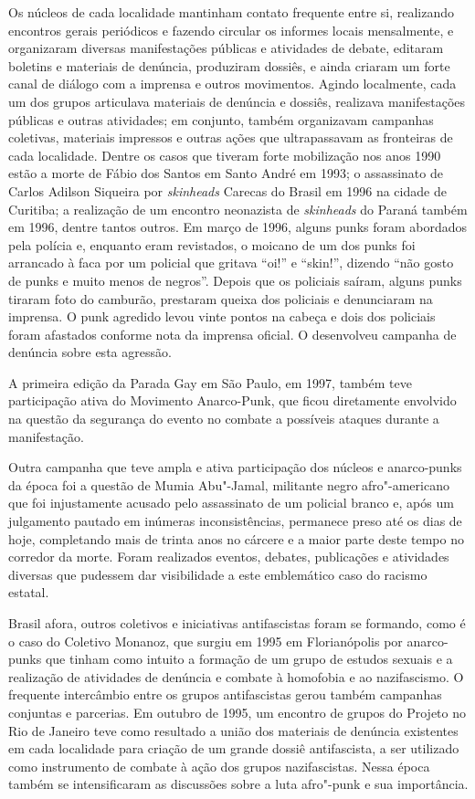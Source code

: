 Os núcleos  de cada localidade mantinham contato frequente entre si, realizando encontros gerais periódicos e fazendo circular os informes locais mensalmente, e organizaram diversas manifestações públicas e atividades de debate, editaram boletins e materiais de denúncia, produziram dossiês, e ainda criaram um forte canal de diálogo com a imprensa e outros movimentos. Agindo localmente, cada um dos grupos articulava materiais de denúncia e dossiês, realizava manifestações públicas e outras atividades; em conjunto, também organizavam campanhas coletivas, materiais impressos e outras ações que ultrapassavam as fronteiras de cada localidade. Dentre os casos que tiveram forte mobilização nos anos 1990 estão a morte de Fábio dos Santos em Santo André em 1993; o assassinato de Carlos Adilson Siqueira por \emph{skinheads} Carecas do Brasil em 1996 na cidade de Curitiba; a realização de um encontro neonazista de \emph{skinheads} do Paraná também em 1996, dentre tantos outros. Em março de 1996, alguns punks foram abordados pela polícia e, enquanto eram revistados, o moicano de um dos punks foi arrancado à faca por um policial que gritava ``oi!'' e ``skin!'', dizendo ``não gosto de punks e muito menos de negros''. Depois que os policiais saíram, alguns punks tiraram foto do camburão, prestaram queixa dos policiais e denunciaram na imprensa. O punk agredido levou vinte pontos na cabeça e dois dos policiais foram afastados conforme nota da imprensa oficial. O  desenvolveu campanha de denúncia sobre esta agressão.

A primeira edição da Parada Gay em São Paulo, em 1997, também teve participação ativa do Movimento Anarco-Punk, que ficou diretamente envolvido na questão da segurança do evento no combate a possíveis ataques durante a manifestação.

Outra campanha que teve ampla e ativa participação dos núcleos  e anarco-punks da época foi a questão de Mumia Abu"-Jamal, militante negro afro"-americano que foi injustamente acusado pelo assassinato de um policial branco e, após um julgamento pautado em inúmeras inconsistências, permanece preso até os dias de hoje, completando mais de trinta anos no cárcere e a maior parte deste tempo no corredor da morte. Foram realizados eventos, debates, publicações e atividades diversas que pudessem dar visibilidade a este emblemático caso do racismo estatal.

Brasil afora, outros coletivos e iniciativas antifascistas foram se formando, como é o caso do Coletivo Monanoz, que surgiu em 1995 em Florianópolis por anarco-punks que tinham como intuito a formação de um grupo de estudos sexuais e a realização de atividades de denúncia e combate à homofobia e ao nazifascismo. O frequente intercâmbio entre os grupos antifascistas gerou também campanhas conjuntas e parcerias. Em outubro de 1995, um encontro de grupos do Projeto  no Rio de Janeiro teve como resultado a união dos materiais de denúncia existentes em cada localidade para criação de um grande dossiê antifascista, a ser utilizado como instrumento de combate à ação dos grupos nazifascistas. Nessa época também se intensificaram as discussões sobre a luta afro"-punk e sua importância.

